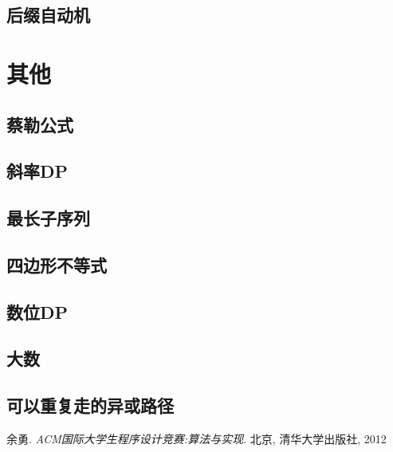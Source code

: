 \documentclass{report}
\begin{document}
    \section{后缀自动机}
        
\chapter{其他}
    \section{蔡勒公式}
        
    \section{斜率DP}
        
    \section{最长子序列}
        
    \section{四边形不等式}
        
    \section{数位DP}
        
    \section{大数}
        
    \section{可以重复走的异或路径}
        
\begin{thebibliography}{9}
余勇. 
\textit{ACM国际大学生程序设计竞赛:算法与实现}. 
北京, 清华大学出版社, 2012
\end{thebibliography}
\end{document}
